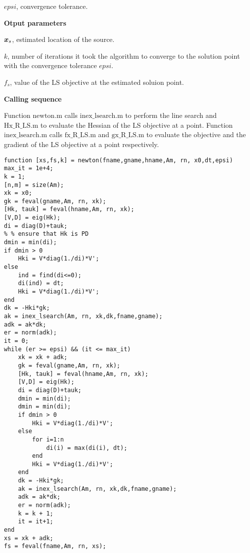 \noindent
$epsi$, convergence tolerance.

\noindent
\textbf{Otput parameters}

\noindent
$\mbox{\boldmath$x$}_s$, estimated location of the source.

\noindent
$k$, number of iterations it took the algorithm to  converge to the solution point with the convergence tolerance $epsi$.

\noindent
$f_s$, value of the LS objective at the estimated soluion point.

\noindent
\textbf{Calling sequence}

\noindent
Function $\mbox{newton.m}$ calls $\mbox{inex\_lsearch.m}$ to perform the line search and $\mbox{Hx\_R\_LS.m}$ to evaluate the Hessian of the LS objective at a point. Function $\mbox{inex\_lsearch.m}$ calls $\mbox{fx\_R\_LS.m}$ and $\mbox{gx\_R\_LS.m}$ to evaluate the objective and the gradient of the LS objective at a point respectively.  

\phantom{m}

\begin{lstlisting}
function [xs,fs,k] = newton(fname,gname,hname,Am, rn, x0,dt,epsi)
max_it = 1e+4;
k = 1;
[n,m] = size(Am);
xk = x0;
gk = feval(gname,Am, rn, xk);
[Hk, tauk] = feval(hname,Am, rn, xk);
[V,D] = eig(Hk);
di = diag(D)+tauk;
% % ensure that Hk is PD
dmin = min(di);
if dmin > 0
    Hki = V*diag(1./di)*V';
else
    ind = find(di<=0);
    di(ind) = dt;
    Hki = V*diag(1./di)*V';
end
dk = -Hki*gk;
ak = inex_lsearch(Am, rn, xk,dk,fname,gname);
adk = ak*dk;
er = norm(adk);
it = 0;
while (er >= epsi) && (it <= max_it)
    xk = xk + adk;
    gk = feval(gname,Am, rn, xk);
    [Hk, tauk] = feval(hname,Am, rn, xk);
    [V,D] = eig(Hk);
    di = diag(D)+tauk;
    dmin = min(di);
    dmin = min(di);
    if dmin > 0
        Hki = V*diag(1./di)*V';
    else
        for i=1:n
            di(i) = max(di(i), dt);
        end
        Hki = V*diag(1./di)*V';
    end
    dk = -Hki*gk;
    ak = inex_lsearch(Am, rn, xk,dk,fname,gname);
    adk = ak*dk;
    er = norm(adk);
    k = k + 1;
    it = it+1;
end
xs = xk + adk;
fs = feval(fname,Am, rn, xs);
\end{lstlisting}


